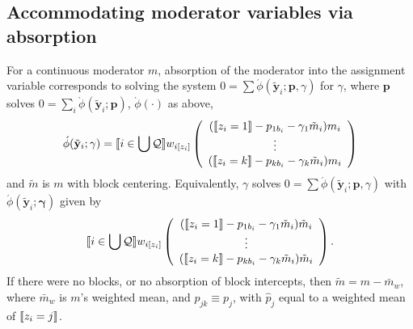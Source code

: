 \documentclass{article}
\DeclarePairedDelimiter{\indicator}{\llbracket}{\rrbracket}
\newcommand{\owt}[1][z_i]{\ensuremath{w_{i[#1]}}}
\begin{document}
\subsection{Accommodating moderator variables via absorption}
\label{sec:accomm-moder-vari}
For a continuous moderator $m$, absorption of the moderator into the assignment variable
corresponds to solving the system $0 = \sum
\acute{\phi}(\tilde{\mathbf{y}}_{i}; \mathbf{p},{\gamma})$ for
$\gamma$, where $\mathbf{p}$ solves $0 =
\sum_{i}\grave{\phi}(\tilde{\mathbf{y}}_{i}; \mathbf{p})$,
$\grave{\phi}(\cdot)$ as above, 
\begin{equation}
  \label{eq:18}
    \acute{\phi}(\tilde{\mathbf{y}}_{i}; \mathbf{\gamma})=
    \indicator{i \in \bigcup \mathcal{Q}} \owt{}
     \left(
                                                 \begin{array}{c}
                                                   (\indicator{z_{i}=1}-p_{1b_{i}}-\gamma_{1}
                                                   \tilde{m}_{i})m_{i} \\
                                                   \vdots\\
                                                   (\indicator{z_{i}=k}-p_{kb_{i}}
                                                   - \gamma_{k} \tilde{m}_{i})m_{i}\\
                                                 \end{array}
  \right)%
\end{equation}
and $\tilde{m}$ is $m$ with block centering. Equivalently, $\gamma$
solves $0 = \sum
\acute{\phi}(\tilde{\mathbf{y}}_{i}; \mathbf{p},{\gamma})$ with 
$\acute{\phi}(\tilde{\mathbf{y}}_{i}; \mathbf{\gamma})$ given by 
\begin{equation*}
    \indicator{i \in \bigcup \mathcal{Q}} \owt{}
     \left(
                                                 \begin{array}{c}
                                                   (\indicator{z_{i}=1}-p_{1b_{i}}-\gamma_{1}
                                                   \tilde{m}_{i})\tilde{m}_{i} \\
                                                   \vdots\\
                                                   (\indicator{z_{i}=k}-p_{kb_{i}}
                                                   - \gamma_{k} \tilde{m}_{i})\tilde{m}_{i}\\
                                                 \end{array}
  \right).
\end{equation*}
If there were no blocks,
or no absorption of block intercepts, then $\tilde{m} = m -
\bar{m}_{w}$,  where $\bar{m}_{w}$ is $m$'s weighted mean, and $p_{jk}
\equiv p_{j}$, with $\hat{p}_{j}$ equal to a weighted mean of
$\indicator{z_{i}=j}$. 
\end{document}
